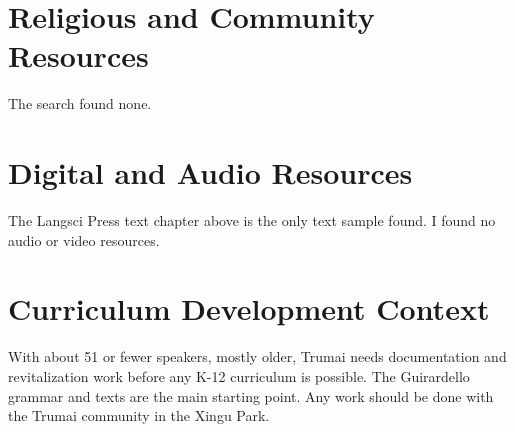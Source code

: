 \documentclass[12pt]{article}
\begin{document}
\section{Religious and Community Resources}
The search found none.

\section{Digital and Audio Resources}
The Langsci Press text chapter above is the only text sample found. I found no audio or video resources.

\section{Curriculum Development Context}
With about 51 or fewer speakers, mostly older, Trumai needs documentation and revitalization work before any K-12 curriculum is possible. The Guirardello grammar and texts are the main starting point. Any work should be done with the Trumai community in the Xingu Park.
\end{document}
